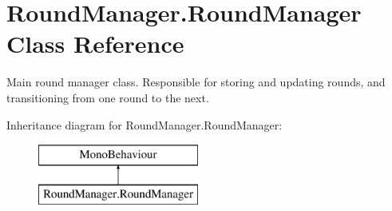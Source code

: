 \hypertarget{class_round_manager_1_1_round_manager}{}\section{Round\+Manager.\+Round\+Manager Class Reference}
\label{class_round_manager_1_1_round_manager}


Main round manager class. Responsible for storing and updating rounds, and transitioning from one round to the next.  


Inheritance diagram for Round\+Manager.\+Round\+Manager\+:\begin{figure}[H]
\begin{center}
\leavevmode
\includegraphics[height=2.000000cm]{class_round_manager_1_1_round_manager}
\end{center}
\end{figure}
